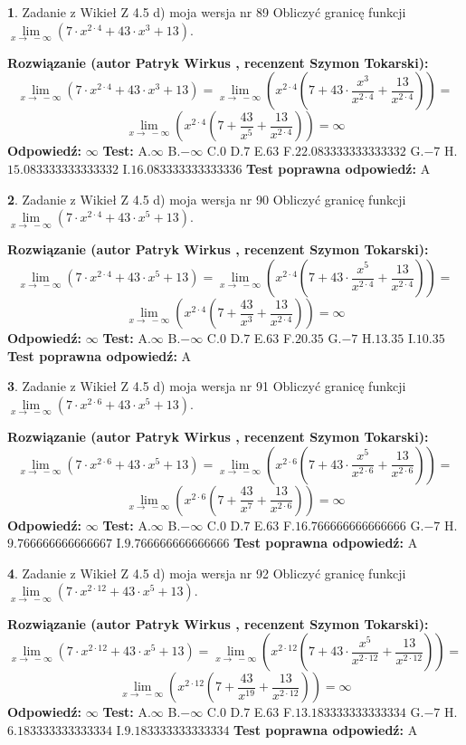 \documentclass[12pt, a4paper]{article}
\theoremstyle{definition} %
\newtheorem{zad}{}
\newcommand{\zadStart}[1]{\begin{zad}#1\newline}
\newcommand{\zadStop}{\end{zad}}
\newcommand{\rozwStart}[2]{\noindent \textbf{Rozwiązanie (autor #1 , recenzent #2): }\newline}
\newcommand{\rozwStop}{\newline}
\newcommand{\odpStart}{\noindent \textbf{Odpowiedź:}\newline}
\newcommand{\odpStop}{\newline}
\newcommand{\testStart}{\noindent \textbf{Test:}\newline}
\newcommand{\testStop}{\newline}
\newcommand{\kluczStart}{\noindent \textbf{Test poprawna odpowiedź:}\newline}
\newcommand{\kluczStop}{\newline}
\begin{document}
\zadStart{Zadanie z Wikieł Z 4.5 d) moja wersja nr 89}
Obliczyć granicę funkcji  $\lim\limits_{x\to\ -\infty}(7 \cdot x^{2\cdot4}+43 \cdot x^{3}+13)$.
\zadStop
\rozwStart{Patryk Wirkus}{Szymon Tokarski}
$$\lim\limits_{x\to\ -\infty}(7 \cdot x^{2\cdot4}+43 \cdot x^{3}+13) = \lim\limits_{x\to\ -\infty}(x^{2\cdot4}(7 +43 \cdot \frac{x^{3}}{x^{2\cdot4}}+\frac{13}{x^{2\cdot4}})) =$$ $$\lim\limits_{x\to\ -\infty}(x^{2\cdot4}(7 +\frac{43}{x^{5}}+\frac{13}{x^{2\cdot4}})) =\infty$$
\rozwStop
\odpStart
$\infty$
\odpStop
\testStart
A.$\infty$ B.$-\infty$ C.$0$ D.$7$ E.$63$
F.$22.083333333333332$ G.$-7$
H.$15.083333333333332$
I.$16.083333333333336$
\testStop
\kluczStart
A
\kluczStop



\zadStart{Zadanie z Wikieł Z 4.5 d) moja wersja nr 90}
Obliczyć granicę funkcji  $\lim\limits_{x\to\ -\infty}(7 \cdot x^{2\cdot4}+43 \cdot x^{5}+13)$.
\zadStop
\rozwStart{Patryk Wirkus}{Szymon Tokarski}
$$\lim\limits_{x\to\ -\infty}(7 \cdot x^{2\cdot4}+43 \cdot x^{5}+13) = \lim\limits_{x\to\ -\infty}(x^{2\cdot4}(7 +43 \cdot \frac{x^{5}}{x^{2\cdot4}}+\frac{13}{x^{2\cdot4}})) =$$ $$\lim\limits_{x\to\ -\infty}(x^{2\cdot4}(7 +\frac{43}{x^{3}}+\frac{13}{x^{2\cdot4}})) =\infty$$
\rozwStop
\odpStart
$\infty$
\odpStop
\testStart
A.$\infty$ B.$-\infty$ C.$0$ D.$7$ E.$63$
F.$20.35$ G.$-7$
H.$13.35$
I.$10.35$
\testStop
\kluczStart
A
\kluczStop



\zadStart{Zadanie z Wikieł Z 4.5 d) moja wersja nr 91}
Obliczyć granicę funkcji  $\lim\limits_{x\to\ -\infty}(7 \cdot x^{2\cdot6}+43 \cdot x^{5}+13)$.
\zadStop
\rozwStart{Patryk Wirkus}{Szymon Tokarski}
$$\lim\limits_{x\to\ -\infty}(7 \cdot x^{2\cdot6}+43 \cdot x^{5}+13) = \lim\limits_{x\to\ -\infty}(x^{2\cdot6}(7 +43 \cdot \frac{x^{5}}{x^{2\cdot6}}+\frac{13}{x^{2\cdot6}})) =$$ $$\lim\limits_{x\to\ -\infty}(x^{2\cdot6}(7 +\frac{43}{x^{7}}+\frac{13}{x^{2\cdot6}})) =\infty$$
\rozwStop
\odpStart
$\infty$
\odpStop
\testStart
A.$\infty$ B.$-\infty$ C.$0$ D.$7$ E.$63$
F.$16.766666666666666$ G.$-7$
H.$9.766666666666667$
I.$9.766666666666666$
\testStop
\kluczStart
A
\kluczStop



\zadStart{Zadanie z Wikieł Z 4.5 d) moja wersja nr 92}
Obliczyć granicę funkcji  $\lim\limits_{x\to\ -\infty}(7 \cdot x^{2\cdot12}+43 \cdot x^{5}+13)$.
\zadStop
\rozwStart{Patryk Wirkus}{Szymon Tokarski}
$$\lim\limits_{x\to\ -\infty}(7 \cdot x^{2\cdot12}+43 \cdot x^{5}+13) = \lim\limits_{x\to\ -\infty}(x^{2\cdot12}(7 +43 \cdot \frac{x^{5}}{x^{2\cdot12}}+\frac{13}{x^{2\cdot12}})) =$$ $$\lim\limits_{x\to\ -\infty}(x^{2\cdot12}(7 +\frac{43}{x^{19}}+\frac{13}{x^{2\cdot12}})) =\infty$$
\rozwStop
\odpStart
$\infty$
\odpStop
\testStart
A.$\infty$ B.$-\infty$ C.$0$ D.$7$ E.$63$
F.$13.183333333333334$ G.$-7$
H.$6.183333333333334$
I.$9.183333333333334$
\testStop
\kluczStart
A
\kluczStop
\end{document}
